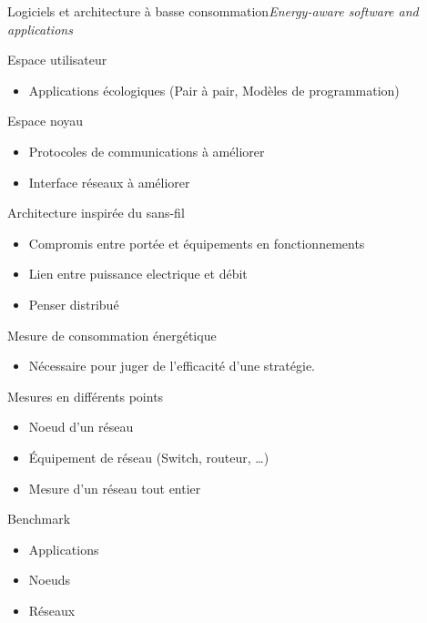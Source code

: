 \begin{frame}{Logiciels et architecture à basse consommation}{\textit{Energy-aware software and applications}}

\begin{block}{Espace utilisateur}
\begin{itemize}
\item Applications écologiques (Pair à pair, Modèles de programmation)
\end{itemize}
\end{block}

\begin{block}{Espace noyau}
\begin{itemize}
\item Protocoles de communications à améliorer
\item Interface réseaux à améliorer
\end{itemize}
\end{block}

\begin{block}{Architecture inspirée du sans-fil}
\begin{itemize}
\item Compromis entre portée et équipements en fonctionnements
\item Lien entre puissance electrique et débit
\item Penser distribué
\end{itemize}
\end{block}


\end{frame}


\begin{frame}{Mesure de consommation énergétique}
\begin{itemize}
\item Nécessaire pour juger de l'efficacité d'une stratégie.
\end{itemize}

\begin{block}{Mesures en différents points}
\begin{itemize}
\item Noeud d'un réseau
\item Équipement de réseau (Switch, routeur, \ldots)
\item Mesure d'un réseau tout entier
\end{itemize}
\end{block}

\begin{block}{Benchmark}
\begin{itemize}
\item Applications
\item Noeuds
\item Réseaux
\end{itemize}
\end{block}
\end{frame}



